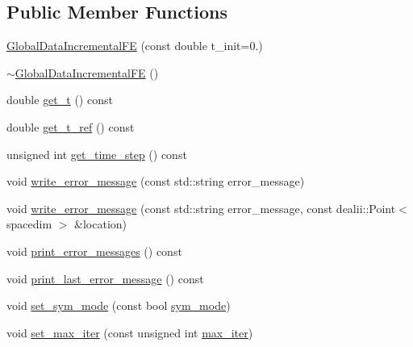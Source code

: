 \subsection*{Public Member Functions}
\begin{DoxyCompactItemize}
\item 
\hyperlink{classincremental_f_e_1_1_global_data_incremental_f_e_ac31163d303902de96e162419a1547495}{Global\+Data\+Incremental\+FE} (const double t\+\_\+init=0.)
\item 
\hyperlink{classincremental_f_e_1_1_global_data_incremental_f_e_a718858c371f43d03f5d1c05560d62a9b}{$\sim$\+Global\+Data\+Incremental\+FE} ()
\item 
double \hyperlink{classincremental_f_e_1_1_global_data_incremental_f_e_af0064c4092b0dbb24817822c3104042f}{get\+\_\+t} () const 
\item 
double \hyperlink{classincremental_f_e_1_1_global_data_incremental_f_e_a81e09842fdcbc393a8bc9ccf3c0cdced}{get\+\_\+t\+\_\+ref} () const 
\item 
unsigned int \hyperlink{classincremental_f_e_1_1_global_data_incremental_f_e_a1d4f31e2249902397992cff85683c3b4}{get\+\_\+time\+\_\+step} () const 
\item 
void \hyperlink{classincremental_f_e_1_1_global_data_incremental_f_e_a9845e6a20c93b8aec769238ac23106da}{write\+\_\+error\+\_\+message} (const std\+::string error\+\_\+message)
\item 
void \hyperlink{classincremental_f_e_1_1_global_data_incremental_f_e_abf2246df069e3f8be4cd74467803159a}{write\+\_\+error\+\_\+message} (const std\+::string error\+\_\+message, const dealii\+::\+Point$<$ spacedim $>$ \&location)
\item 
void \hyperlink{classincremental_f_e_1_1_global_data_incremental_f_e_a3aaaf483ad4e6dbfc189e7ab2b44d21b}{print\+\_\+error\+\_\+messages} () const 
\item 
void \hyperlink{classincremental_f_e_1_1_global_data_incremental_f_e_a49d0b9cfe7b58e4f5e15e77733983d78}{print\+\_\+last\+\_\+error\+\_\+message} () const 
\item 
void \hyperlink{classincremental_f_e_1_1_global_data_incremental_f_e_a8378d6a77b65364d8036f8a111e86de0}{set\+\_\+sym\+\_\+mode} (const bool \hyperlink{classincremental_f_e_1_1_global_data_incremental_f_e_a9986ee5bfccc1b5936c585cf0c5a4474}{sym\+\_\+mode})
\item 
void \hyperlink{classincremental_f_e_1_1_global_data_incremental_f_e_a5b5ebd81c1da8af2321f79e44a89c9cf}{set\+\_\+max\+\_\+iter} (const unsigned int \hyperlink{classincremental_f_e_1_1_global_data_incremental_f_e_ad15c334652b6a9d6843c360c6e2005ec}{max\+\_\+iter})

\end{DoxyCompactItemize}
